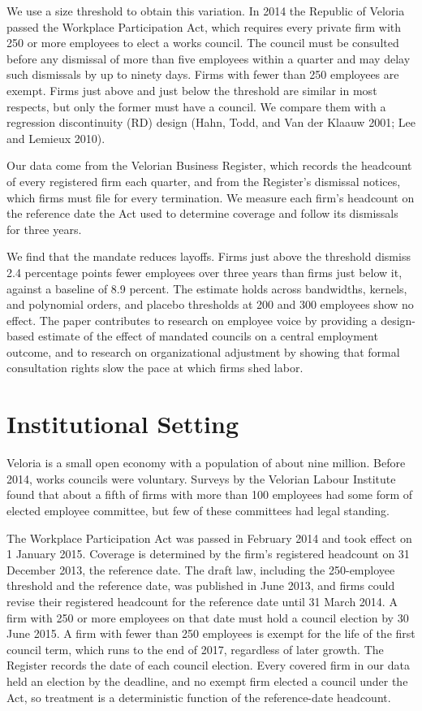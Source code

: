\documentclass[12pt]{article}
\begin{document}
We use a size threshold to obtain this variation. In 2014 the Republic of Veloria passed the Workplace Participation Act, which requires every private firm with 250 or more employees to elect a works council. The council must be consulted before any dismissal of more than five employees within a quarter and may delay such dismissals by up to ninety days. Firms with fewer than 250 employees are exempt. Firms just above and just below the threshold are similar in most respects, but only the former must have a council. We compare them with a regression discontinuity (RD) design (Hahn, Todd, and Van der Klaauw 2001; Lee and Lemieux 2010).

Our data come from the Velorian Business Register, which records the headcount of every registered firm each quarter, and from the Register's dismissal notices, which firms must file for every termination. We measure each firm's headcount on the reference date the Act used to determine coverage and follow its dismissals for three years.

We find that the mandate reduces layoffs. Firms just above the threshold dismiss 2.4 percentage points fewer employees over three years than firms just below it, against a baseline of 8.9 percent. The estimate holds across bandwidths, kernels, and polynomial orders, and placebo thresholds at 200 and 300 employees show no effect. The paper contributes to research on employee voice by providing a design-based estimate of the effect of mandated councils on a central employment outcome, and to research on organizational adjustment by showing that formal consultation rights slow the pace at which firms shed labor.

\section{Institutional Setting}

Veloria is a small open economy with a population of about nine million. Before 2014, works councils were voluntary. Surveys by the Velorian Labour Institute found that about a fifth of firms with more than 100 employees had some form of elected employee committee, but few of these committees had legal standing.

The Workplace Participation Act was passed in February 2014 and took effect on 1 January 2015. Coverage is determined by the firm's registered headcount on 31 December 2013, the reference date. The draft law, including the 250-employee threshold and the reference date, was published in June 2013, and firms could revise their registered headcount for the reference date until 31 March 2014. A firm with 250 or more employees on that date must hold a council election by 30 June 2015. A firm with fewer than 250 employees is exempt for the life of the first council term, which runs to the end of 2017, regardless of later growth. The Register records the date of each council election. Every covered firm in our data held an election by the deadline, and no exempt firm elected a council under the Act, so treatment is a deterministic function of the reference-date headcount.
\end{document}
